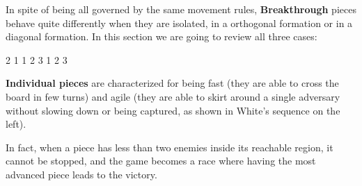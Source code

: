 \documentclass[a4paper,12pt]{article}
\newcommand{\BT}{\textbf{Breakthrough}\xspace}  %
\begin{document}
    In spite of being all governed by the same movement rules, \BT pieces behave quite differently when they are isolated, in a orthogonal formation or in a diagonal formation.  In this section we are going to review all three cases:

    \begin{minipage}[c]{0.36\linewidth}
        \begin{center}
            \begin{othelloboardnorefs}{0.75}
                \annotationsfirstrow	{} {} {} {} {} {} {2}{}
                \annotationssecondrow	{} {} {} {} {} {} {1}{}
                \annotationsthirdrow	{} {} {} {} {} {} {} {}
                \annotationsfourthrow	{} {1}{} {} {} {} {} {}
                \annotationsfifthrow	{} {} {2}{} {} {} {} {}
                \annotationssixthrow	{} {3}{} {} {} {} {1}{}
                \annotationsseventhrow	{} {} {} {} {} {} {2}{}
                \annotationseighthrow	{} {} {} {} {} {} {3}{}
            \end{othelloboardnorefs}
        \end{center}
    \end{minipage}
    \hfill
    \begin{minipage}[c]{0.62\linewidth}
        \textbf{Individual pieces} are characterized for being fast (they are able to cross the board in few turns) and agile (they are able to skirt around a single adversary without slowing down or being captured, as shown in White's sequence on the left).

        In fact, when a piece has less than two enemies inside its reachable region, it cannot be stopped, and the game becomes a race where having the most advanced piece leads to the victory.
    \end{minipage}

\end{document}
